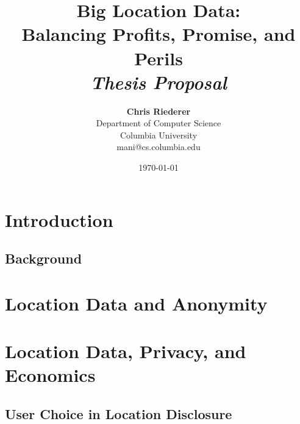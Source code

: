 \documentclass[12pt]{report}
\title{{\bf Big Location Data: \\ Balancing Profits, Promise, and Perils} \\
\it Thesis Proposal}
\author{ {\bf Chris Riederer}  \\
Department of Computer Science \\
Columbia University\\
{\small mani@cs.columbia.edu}
}
\date{\today}
\begin{document}
\pagestyle{plain}
\maketitle

\pagebreak
\begin{abstract}

\end{abstract}

\pagebreak
\tableofcontents
\pagebreak

\cleardoublepage
{}

\chapter{Introduction}
\label{ch:intro}

  \section{Background}
  \label{sec:background}
  


\chapter{Location Data and Anonymity}
\label{sec:anon}



\chapter{Location Data, Privacy, and Economics}
\label{sec:econ}


\section{User Choice in Location Disclosure}
\label{sec:keyword}

\end{document}
